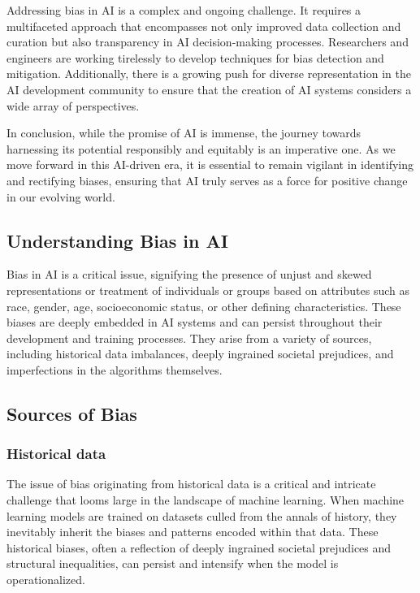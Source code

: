 \documentclass[12pt,a4paper,openright,twoside]{book}
\begin{document}
Addressing bias in AI is a complex and ongoing challenge. It requires a multifaceted approach that encompasses not only improved data collection and curation but also transparency in AI decision-making processes. Researchers and engineers are working tirelessly to develop techniques for bias detection and mitigation. Additionally, there is a growing push for diverse representation in the AI development community to ensure that the creation of AI systems considers a wide array of perspectives. 

In conclusion, while the promise of AI is immense, the journey towards harnessing its potential responsibly and equitably is an imperative one. As we move forward in this AI-driven era, it is essential to remain vigilant in identifying and rectifying biases, ensuring that AI truly serves as a force for positive change in our evolving world. \cite{10.1145/3308560.3317590}

\subsection{Understanding Bias in AI}
Bias in AI is a critical issue, signifying the presence of unjust and skewed representations or treatment of individuals or groups based on attributes such as race, gender, age, socioeconomic status, or other defining characteristics. These biases are deeply embedded in AI systems and can persist throughout their development and training processes. They arise from a variety of sources, including historical data imbalances, deeply ingrained societal prejudices, and imperfections in the algorithms themselves.

\subsection{Sources of Bias}
\subsubsection{Historical data} 
The issue of bias originating from historical data is a critical and intricate challenge that looms large in the landscape of machine learning. When machine learning models are trained on datasets culled from the annals of history, they inevitably inherit the biases and patterns encoded within that data. These historical biases, often a reflection of deeply ingrained societal prejudices and structural inequalities, can persist and intensify when the model is operationalized. \cite{10.1145/3308560.3317590}
\end{document}
